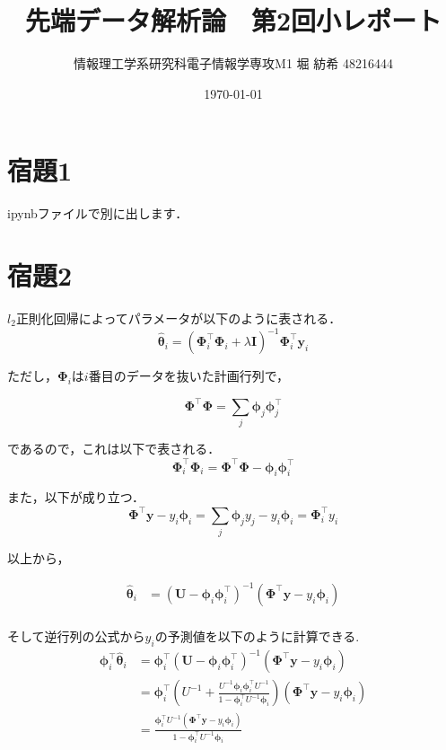 \documentclass[a4paper,11pt]{jsarticle}
\begin{document}
  \title{先端データ解析論　第2回小レポート}
  \author{情報理工学系研究科電子情報学専攻M1 堀 紡希 48216444}
  \date{\today}
  \maketitle

  \section*{宿題1}
  ipynbファイルで別に出します．

  \section*{宿題2}
  $l_2$正則化回帰によってパラメータが以下のように表される．
  \begin{equation}
    \hat{\bm \theta}_i = ({\bm \Phi} ^\top _i
    {\bm \Phi }_i + \lambda {\bm I})^{-1} 
    {\bm \Phi }_i ^\top {\bm y}_i
  \end{equation}

  ただし，${\bm \Phi }_i$は$i$番目のデータを抜いた計画行列で，

  \[{\bm \Phi }^\top{\bm \Phi } = \sum _j {\bm \phi}_j{\bm \phi}_j^\top\]

  であるので，これは以下で表される．
  \[ {\bm \Phi} ^\top _i
  {\bm \Phi }_i = {\bm \Phi} ^\top 
  {\bm \Phi } - {\bm \phi}_i{\bm \phi}_i^\top  \]

  
  また，以下が成り立つ．
  \[{\bm \Phi }^\top {\bm y} -y_i \bm{\phi}_i = \sum _j {\bm \phi_j y_j} -y_i \bm{\phi}_i = {\bm \Phi}_i^\top y_i \]

  以上から，

  \begin{align*}
    \hat{\bm \theta}_i &= ({\bm U} - {\bm \phi}_i{\bm \phi}_i^\top)^{-1} ({\bm \Phi}^\top{\bm y} - y_i {\bm \phi}_i )\\
  \end{align*}

  そして逆行列の公式から$y_i$の予測値を以下のように計算できる.
  \begin{align*}
    {\bm \phi}_i^\top\hat{\bm \theta}_i &= {\bm \phi}_i^\top({\bm U} - {\bm \phi}_i{\bm \phi}_i^\top)^{-1} ({\bm \Phi}^\top{\bm y} - y_i {\bm \phi}_i )\\
    &= {\bm \phi}_i^\top \left( U^{-1} + \frac{U^{-1} {\bm \phi}_i {\bm \phi}_i ^\top U^{-1}}{1-{\bm \phi}_i ^\top U ^{-1} {\bm \phi}_i} \right)({\bm \Phi}^\top{\bm y} - y_i {\bm \phi}_i )\\
    &= \frac{{\bm \phi}_i ^\top U^{-1}({\bm \Phi}^\top {\bm y} - y_i {\bm \phi}_i)}{1-{\bm \phi}_i ^\top U ^{-1} {\bm \phi}_i}
  \end{align*}
\end{document}
